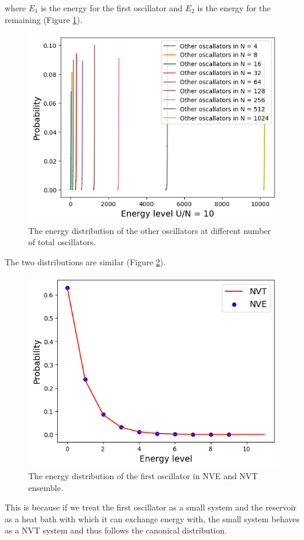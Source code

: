 \documentclass{assignmeownt}
\begin{document}
where $E_1$ is the energy for the first oscillator and $E_2$ is the energy for the remaining (Figure \ref{fig:boltzmann_oscillator_other}).

\begin{figure}
  \centering
  \includegraphics[width=0.5\linewidth]{../block1/3-CoupledHarmonicOscillator/Results/2.png}
  \caption{The energy distribution of the other oscillators at different number of total oscillators.}
  \label{fig:boltzmann_oscillator_other}
\end{figure}


The two distributions are similar (Figure \ref{fig:boltzmann_oscillator_comparison}).

\begin{figure}
  \centering
  \includegraphics[width=0.5\linewidth]{../block1/3-CoupledHarmonicOscillator/Results/3.png}
  \caption{The energy distribution of the first oscillator in NVE and NVT ensemble.}
  \label{fig:boltzmann_oscillator_comparison}
\end{figure}


This is because if we treat the first oscillator as a small system and the reservoir as a heat bath with which it can exchange energy with, the small system behaves as a NVT system and thus follows the canonical distribution.
\end{document}
